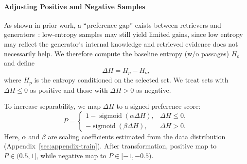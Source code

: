\documentclass[11pt]{article}
\begin{document}

\paragraph{Adjusting Positive and Negative Samples}
As shown in prior work, a ``preference gap'' exists between retrievers and generators~\citep{ke2024bridging,jiang2025gainrag,dong2025understand}: low-entropy samples may still yield limited gains, since low entropy may reflect the generator’s internal knowledge and retrieved evidence does not necessarily help.
We therefore compute the baseline entropy (w/o passages) \(H_o\) and define
\begin{equation}
    \Delta H = H_p - H_o,
\end{equation}
where \(H_p\) is the entropy conditioned on the selected set. 
We treat sets with \(\Delta H \le 0\) as positive and those with \(\Delta H > 0\) as negative. 

To increase separability, we map \(\Delta H\) to a signed preference score:
\begin{equation}
\label{eq:map}
    P=
    \begin{cases}
    1-\operatorname{sigmoid}(\alpha \Delta H), & \Delta H \le 0,\\
    -\operatorname{sigmoid}(\beta \Delta H), & \Delta H > 0.
    \end{cases}
\end{equation}
Here, \(\alpha\) and \(\beta\) are scaling coefficients estimated from the data distribution (Appendix~\ref{sec:appendix-train}). 
After transformation, positive map to \(P \in (0.5, 1]\), while negative map to \(P \in [-1, -0.5)\). 
\end{document}
